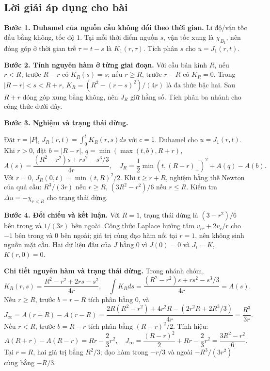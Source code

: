 \documentclass[10pt,a4paper]{article}
\begin{document}
\subsection*{Lời giải áp dụng cho bài}
\textbf{Bước 1. Duhamel của nguồn cầu không đổi theo thời gian.} Li độ/vận tốc đầu bằng không, tốc độ $1$. Tại mỗi thời điểm nguồn $s$, vận tốc xung là $\chi_{B_1}$, nên đóng góp ở thời gian trễ $\tau=t-s$ là $K_1(r,\tau)$. Tích phân $s$ cho $u=J_1(r,t)$.

\textbf{Bước 2. Tính nguyên hàm ở từng giai đoạn.} Với cầu bán kính $R$, nếu $r<R$, trước $R-r$ có $K_R(s)=s$; nếu $r\ge R$, trước $r-R$ có $K_R=0$. Trong $|R-r|<s<R+r$, $K_R=(R^2-(r-s)^2)/(4r)$ là đa thức bậc hai. Sau $R+r$ đóng góp xung bằng không, nên $J_R$ giữ hằng số. Tích phân ba nhánh cho công thức dưới đây.

\textbf{Bước 3. Nghiệm và trạng thái dừng.}

Đặt $r=|P|$, $J_R(r,t)=\int_0^tK_R(r,s)ds$ với $c=1$. Duhamel cho $u=J_1(r,t)$. Khi $r>0$, đặt $b=|R-r|$, $q=\min(\max(t,b),R+r)$,
\[A(s)=\frac{(R^2-r^2)s+rs^2-s^3/3}{4r},\quad J_R=\frac12\min(t,(R-r)_+)^2+A(q)-A(b).\]
Với $r=0$, $J_R(0,t)=\min(t,R)^2/2$. Khi $t\ge r+R$, nghiệm bằng thế Newton của quả cầu: $R^3/(3r)$ nếu $r\ge R$, $(3R^2-r^2)/6$ nếu $r\le R$. Kiểm tra $\Delta u=-\chi_{r<R}$ cho trạng thái dừng.

\textbf{Bước 4. Đối chiếu và kết luận.} Với $R=1$, trạng thái dừng là $(3-r^2)/6$ bên trong và $1/(3r)$ bên ngoài. Công thức Laplace hướng tâm $v_{rr}+2v_r/r$ cho $-1$ bên trong và $0$ bên ngoài; giá trị cùng đạo hàm nối tại $r=1$, nên không sinh nguồn mặt cầu. Hai dữ liệu đầu của $J$ bằng $0$ vì $J(0)=0$ và $J_t=K$, $K(r,0)=0$.

\textbf{Chi tiết nguyên hàm và trạng thái dừng.} Trong nhánh chỏm,
\[K_R(r,s)=\frac{R^2-r^2+2rs-s^2}{4r},\quad
\int K_Rds=\frac{(R^2-r^2)s+rs^2-s^3/3}{4r}=A(s).\]
Nếu $r\ge R$, trước $b=r-R$ tích phân bằng $0$, và
\[J_\infty=A(r+R)-A(r-R)
=\frac{2R(R^2-r^2)+4r^2R-(2r^2R+2R^3/3)}{4r}
=\frac{R^3}{3r}.\]
Nếu $r<R$, trước $b=R-r$ tích phân bằng $(R-r)^2/2$. Tính hiệu:
\[A(R+r)-A(R-r)=Rr-\frac23r^2,\quad
J_\infty=\frac{(R-r)^2}{2}+Rr-\frac23r^2=\frac{3R^2-r^2}{6}.\]
Tại $r=R$, hai giá trị bằng $R^2/3$; đạo hàm trong $-r/3$ và ngoài $-R^3/(3r^2)$ cùng bằng $-R/3$.
\end{document}
